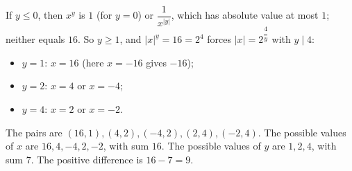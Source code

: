 If $y\le0$, then $x^y$ is $1$ (for $y=0$) or $\dfrac{1}{x^{|y|}}$, which has absolute value at most $1$; neither equals $16$. So $y\ge1$, and $|x|^y=16=2^4$ forces $|x|=2^{\dfrac{4}{y}}$ with $y\mid4$:
\begin{itemize}
\item $y=1$: $x=16$ (here $x=-16$ gives $-16$);
\item $y=2$: $x=4$ or $x=-4$;
\item $y=4$: $x=2$ or $x=-2$.
\end{itemize}
The pairs are $(16,1),(4,2),(-4,2),(2,4),(-2,4)$. The possible values of $x$ are $16,4,-4,2,-2$, with sum $16$. The possible values of $y$ are $1,2,4$, with sum $7$. The positive difference is $16-7=\boxed{9}$.
